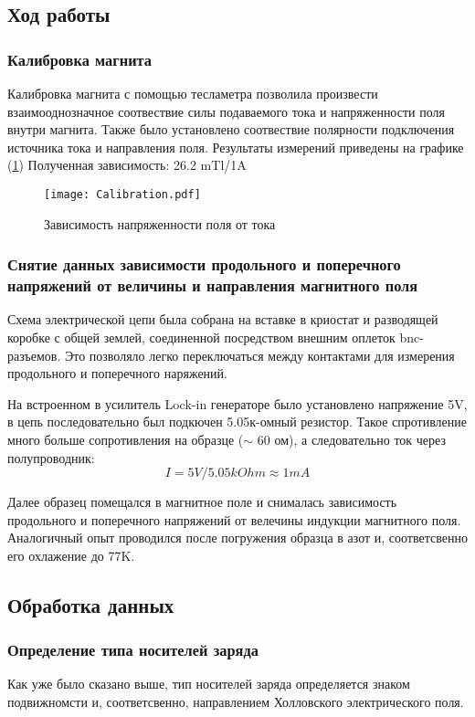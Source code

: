 \subsection{Ход работы}
\subsubsection{Калибровка магнита}
Калибровка магнита с помощью тесламетра позволила произвести взаимооднозначное соотвествие силы подаваемого тока и напряженности поля внутри магнита. Также было установлено соотвествие полярности подключения источника тока и направления поля. Результаты измерений приведены на графике (\ref{fig:calib}) Полученная зависимость: 26.2 mTl/1A

\begin{figure}[H]
	\centering
	\texttt{[image: Calibration.pdf]}
	\caption{Зависимость напряженности поля от тока}
	\label{fig:calib}
\end{figure}

\subsubsection{Снятие данных зависимости продольного и поперечного напряжений от величины и направления магнитного поля }
Схема электрической цепи была собрана на вставке в криостат и разводящей коробке с общей землей, соединенной посредством внешним оплеток bnc-разъемов. Это позволяло легко переключаться между контактами для измерения продольного и поперечного  наряжений.

На встроенном в усилитель Lock-in генераторе было установлено напряжение 5V, в цепь последовательно был подкючен  5.05к-омный резистор. Такое спротивление много больше сопротивления на образце ($\sim$ 60 ом), а следовательно ток через полупроводник: $$I=5V/5.05kOhm\approx1mA$$

Далее образец помещался в магнитное поле и снималась зависимость продольного и поперечного напряжений от велечины индукции магнитного поля. Аналогичный опыт проводился после погружения образца в азот и, соответсвенно его охлажение до 77K.

\subsection{Обработка данных}
\subsubsection{Определение типа носителей заряда}
Как уже было сказано выше, тип носителей заряда определяется знаком подвижномсти и, соответсвенно, направлением Холловского электрического поля. 

